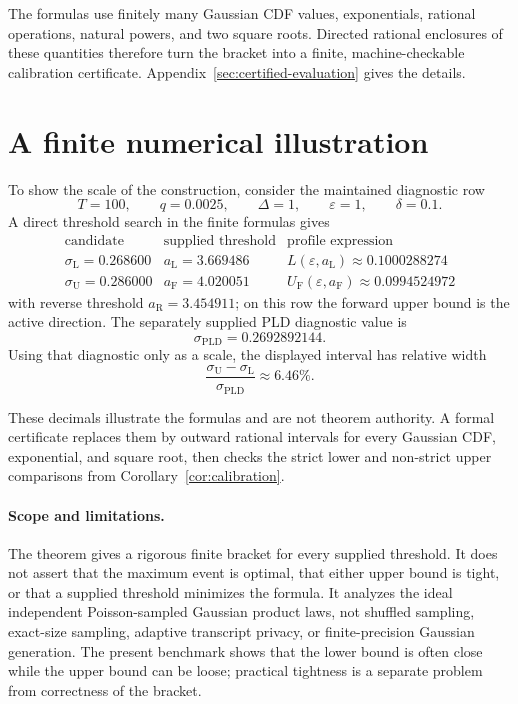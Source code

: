 \documentclass[11pt]{article}
\theoremstyle{remark}
\begin{document}
The formulas use finitely many Gaussian CDF values, exponentials, rational
operations, natural powers, and two square roots.  Directed rational
enclosures of these quantities therefore turn the bracket into a finite,
machine-checkable calibration certificate.  Appendix~\ref{sec:certified-evaluation}
gives the details.

\section{A finite numerical illustration}

To show the scale of the construction, consider the maintained diagnostic
row
\[
  T=100,\qquad q=0.0025,\qquad \Delta=1,
  \qquad \varepsilon=1,\qquad \delta=0.1.
\]
A direct threshold search in the finite formulas gives
\[
\begin{array}{c|c|c}
\text{candidate} & \text{supplied threshold} & \text{profile expression}\\
\hline
\sigma_{\mathrm L}=0.268600 & a_{\mathrm L}=3.669486
  & L(\varepsilon,a_{\mathrm L})\approx0.1000288274\\
\sigma_{\mathrm U}=0.286000 & a_{\mathrm F}=4.020051
  & U_{\mathrm F}(\varepsilon,a_{\mathrm F})\approx0.0994524972
\end{array}
\]
with reverse threshold $a_{\mathrm R}=3.454911$; on this row the forward
upper bound is the active direction.  The separately supplied PLD diagnostic
value is
\[
  \sigma_{\mathrm{PLD}}=0.2692892144.
\]
Using that diagnostic only as a scale, the displayed interval has relative
width
\[
  \frac{\sigma_{\mathrm U}-\sigma_{\mathrm L}}
       {\sigma_{\mathrm{PLD}}}
  \approx 6.46\%.
\]

These decimals illustrate the formulas and are not theorem authority.  A
formal certificate replaces them by outward rational intervals for every
Gaussian CDF, exponential, and square root, then checks the strict lower and
non-strict upper comparisons from Corollary~\ref{cor:calibration}.

\paragraph{Scope and limitations.}
The theorem gives a rigorous finite bracket for every supplied threshold.  It
does not assert that the maximum event is optimal, that either upper bound is
tight, or that a supplied threshold minimizes the formula.  It analyzes the
ideal independent Poisson-sampled Gaussian product laws, not shuffled
sampling, exact-size sampling, adaptive transcript privacy, or finite-precision
Gaussian generation.  The present benchmark shows that the lower bound is
often close while the upper bound can be loose; practical tightness is a
separate problem from correctness of the bracket.
\end{document}
